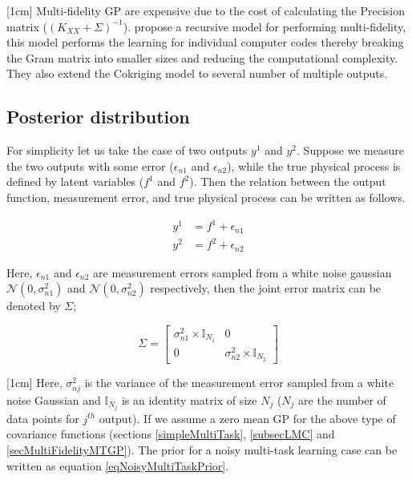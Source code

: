 [1cm]
Multi-fidelity GP are expensive due to the cost of calculating the Precision matrix ($(K_{XX} + \Sigma)^{-1}$). \cite{le2013multi} propose a recursive model for performing multi-fidelity, this model performs the learning for individual computer codes thereby breaking the Gram matrix into smaller sizes and reducing the computational complexity. They also extend the Cokriging model to several number of multiple outputs.

\subsection{Posterior distribution}\label{subsecPosteriorDistribution}
For simplicity let us take the case of two outputs \(y^{1}\) and \(y^{2}\). Suppose we measure the two outputs with some error ($\epsilon_{n1}$ and $\epsilon_{n2}$), while the true physical process is defined by latent variables (\(f^{1}\) and \(f^{2}\)). Then the relation between the output function, measurement error, and true physical process can be written as follows. 

\begin{align} \label{eq:relationOutputLatent}
y^{1} & = f^{1} + \epsilon_{n1} \\
y^{2} & = f^{2} + \epsilon_{n2}
\end{align} 

Here, \(\epsilon_{n1}\) and \(\epsilon_{n2}\) are measurement errors sampled from a white noise gaussian \(\mathcal{N}(0, \sigma_{n1}^2)\) and \(\mathcal{N}(0, \sigma_{n2}^2)\) respectively, then the joint error matrix can be denoted by \(\Sigma\);

\begin{equation}\label{eq:sigmaToError}
         \Sigma = 
          \begin{bmatrix}
          \sigma _{n1}^{2} \times \mathbb{I}_{N_{1}} & 0 \\ 
          0 & \sigma _{n2}^{2} \times \mathbb{I}_{N_{2}}
          \end{bmatrix} 
\end{equation}

[1cm]
Here, \(\sigma_{nj}^2\) is the variance of the measurement error sampled from a white noise Gaussian and \(\mathbb{I}_{N_{j}}\) is an identity matrix of size \(N_{j}\) (\(N_{j}\) are the number of data points for \(j^{th}\) output). If we assume a zero mean GP for the above type of covariance functions (sections \ref{simpleMultiTask}, \ref{subsecLMC} and \ref{secMultiFidelityMTGP}). The prior for a noisy multi-task learning case can be written as equation \ref{eqNoisyMultiTaskPrior}.


